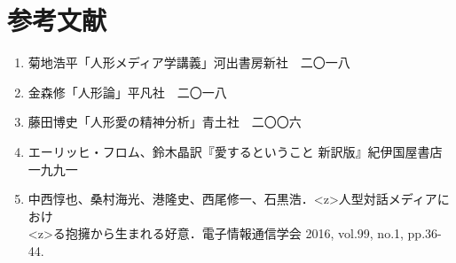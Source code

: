 \documentclass[b5j,twoside,twocolumn]{utarticle}
\begin{document}
\section*{参考文献}
{\small
\begin{enumerate}
\renewcommand{\labelenumi}{\pbox<y>{[\arabic{enumi}]}}
\item 菊地浩平「人形メディア学講義」河出書房新社　二〇一八
\item 金森修「人形論」平凡社　二〇一八
\item 藤田博史「人形愛の精神分析」青土社　二〇〇六
\item エーリッヒ・フロム、鈴木晶訳『愛するということ 新訳版』紀伊国屋書店　一九九一
\item 中西惇也、桑村海光、港隆史、西尾修一、石黒浩．\pbox<z>{人型対話メディアにおけ}\\ \pbox<z>{る抱擁から生まれる好意．電子情報通信学会 2016, vol.99, no.1, pp.36-44.}
\end{enumerate}
}
\end{document}
